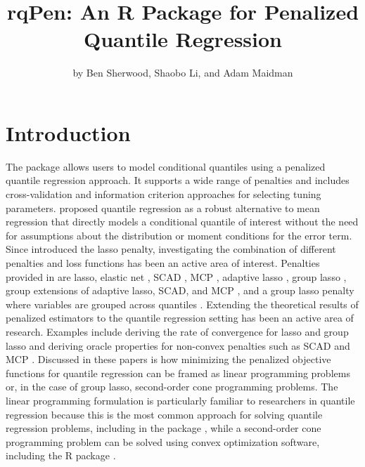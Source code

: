 \title{rqPen: An R Package for Penalized Quantile Regression}


\author{by Ben Sherwood, Shaobo Li, and Adam Maidman}

\maketitle


\section{Introduction}\label{introduction}

The package  allows users to model conditional quantiles using a penalized quantile regression approach. It supports a wide range of penalties and includes cross-validation and information criterion approaches for selecting tuning parameters. \cite{origQR} proposed quantile regression as a robust alternative to mean regression that
directly models a conditional quantile of interest without the need for assumptions about the
distribution or moment conditions for the error term. Since \citet{lasso} introduced the lasso penalty, investigating the combination of different penalties and loss functions has been an active area of interest. Penalties provided in  are lasso, elastic net \citep{zou05}, SCAD \citep{fanLi}, MCP \citep{mcp}, adaptive lasso \citep{adaptiveLasso}, group lasso \citep{yuan2007}, group extensions of adaptive lasso, SCAD, and MCP \citep{grSCAD, groupReview, penBiLevel}, and a group lasso penalty where variables are grouped across quantiles \citep{heteroIdQR}. Extending the theoretical results of penalized estimators to the quantile regression setting has been an active area of research. Examples include deriving the rate of convergence for lasso \citep{qr_lasso} and group lasso \citep{qr_group_lasso} and deriving oracle properties for non-convex penalties such as SCAD and MCP \citep{lan_scad}. Discussed in these papers is how minimizing the penalized objective functions for quantile regression can be framed as linear programming problems or, in the case of group lasso, second-order cone programming problems. The linear programming formulation is particularly familiar to researchers in quantile regression because this is the most common approach for solving quantile regression problems, including in the  package \citep{crq1,crq2}, while a second-order cone programming problem can be solved using convex optimization software, including the R package  \citep{JSSv060i05}.

